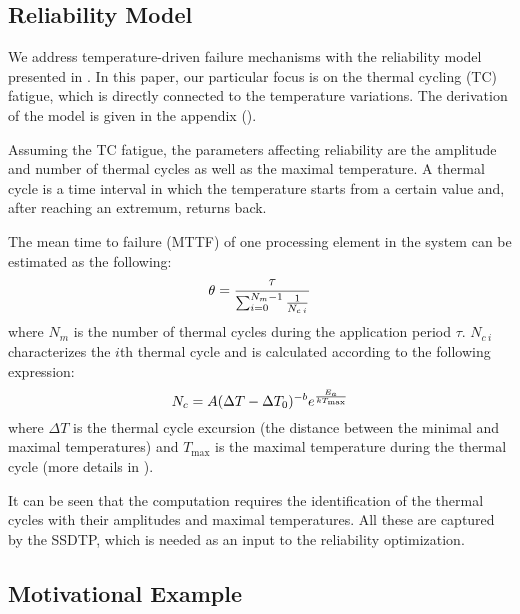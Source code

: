 \subsection{Reliability Model}

We address temperature-driven failure mechanisms with the reliability model
presented in \cite{huang2009, xiang2010}. In this paper, our particular focus is
on the thermal cycling (TC) fatigue, which is directly connected to the
temperature variations. The derivation of the model is given in the appendix
().

Assuming the TC fatigue, the parameters affecting reliability are the amplitude
and number of thermal cycles as well as the maximal temperature. A thermal cycle
is a time interval in which the temperature starts from a certain value and,
after reaching an extremum, returns back.

The mean time to failure (MTTF) of one processing element in the system can be
estimated as the following:
\begin{align} \elab{one-mttf}
  \theta = \frac{\tau}{\sum_{i=0}^{N_m - 1} \frac{1}{N_{c \: i}}}
\end{align}
where $N_m$ is the number of thermal cycles during the application period
$\tau$. $N_{c \: i}$ characterizes the $i$th thermal cycle and is calculated
according to the following expression:
\begin{equation} \elab{cycles-to-failure}
  N_c = A (\Delta T - \Delta T_0)^{-b} e^{\frac{E_a}{k T_\text{max}}}
\end{equation}
where $\Delta T$ is the thermal cycle excursion (the distance between the
minimal and maximal temperatures) and $T_\text{max}$ is the maximal temperature
during the thermal cycle (more details in ).

It can be seen that the computation requires the identification of the thermal
cycles with their amplitudes and maximal temperatures. All these are captured by
the SSDTP, which is needed as an input to the reliability optimization.

\subsection{Motivational Example}

